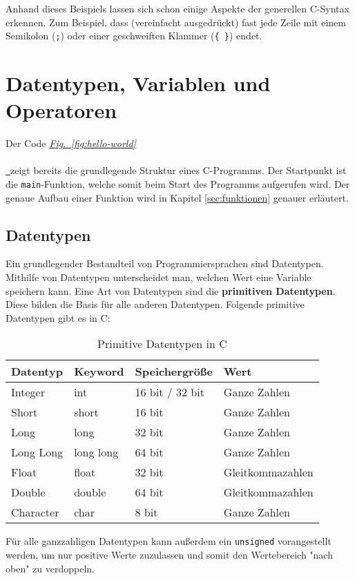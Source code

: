 \documentclass[11pt]{article}
\newcommand*{\figref}[2][]{%
  \hyperref[{fig:#2}]{%
    \textit{Fig.~\ref*{fig:#2}}%
    \ifx\\#1\\%
    \else
      \,#1%
    \fi
  }%
}
\begin{document}
Anhand dieses Beispiels lassen sich schon einige Aspekte der generellen C-Syntax erkennen. Zum Beispiel, dass (vereinfacht 
ausgedrückt) fast jede Zeile mit einem Semikolon (\texttt{;}) oder einer geschweiften Klammer (\texttt{\{ \}}) endet. 

\section{Datentypen, Variablen und Operatoren}
Der Code \figref{hello-world} zeigt bereits die grundlegende Struktur eines C-Programms. Der Startpunkt ist die
\texttt{main}-Funktion, welche somit beim Start des Programms aufgerufen wird. Der genaue Aufbau einer Funktion wird in
Kapitel \ref{sec:funktionen} genauer erläutert.

\subsection{Datentypen}
Ein grundlegender Bestandteil von Programmiersprachen sind Datentypen. Mithilfe von Datentypen unterscheidet man, welchen
Wert eine Variable speichern kann. Eine Art von Datentypen sind die \textbf{primitiven Datentypen}. Diese bilden die Basis
für alle anderen Datentypen. Folgende primitive Datentypen gibt es in C:
\begin{table}[h!]
  \centering
  \begin{tabular}{@{}llll@{}}
    \toprule
    Datentyp  & Keyword   & Speichergröße   & Wert             \\ \midrule
    Integer   & int       & 16 bit / 32 bit & Ganze Zahlen     \\
    Short     & short     & 16 bit          & Ganze Zahlen     \\
    Long      & long      & 32 bit          & Ganze Zahlen     \\
    Long Long & long long & 64 bit          & Ganze Zahlen     \\
    Float     & float     & 32 bit          & Gleitkommazahlen \\
    Double    & double    & 64 bit          & Gleitkommazahlen \\
    Character & char      & 8 bit           & Ganze Zahlen     \\ \bottomrule
  \end{tabular}
  \caption{Primitive Datentypen in C}
\end{table}

Für alle ganzzahligen Datentypen kann außerdem ein \texttt{unsigned} vorangestellt werden, um nur positive Werte
zuzulassen und somit den Wertebereich "nach oben" zu verdoppeln.
\end{document}
